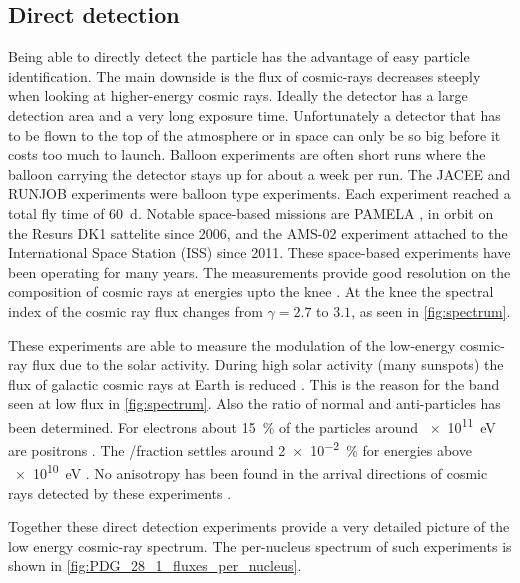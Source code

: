 \subsection{Direct detection}

Being able to directly detect the particle has the advantage of easy particle identification. The main downside is the flux of cosmic-rays decreases steeply when looking at higher-energy cosmic rays. Ideally the detector has a large detection area and a very long exposure time. Unfortunately a detector that has to be flown to the top of the atmosphere or in space can only be so big before it costs too much to launch. Balloon experiments are often short runs where the balloon carrying the detector stays up for about a week per run. The JACEE \cite{asakimori1998jacee} and RUNJOB \cite{hareyama2011runjob} experiments were balloon type experiments. Each experiment reached a total fly time of \SI{60}{\day}. Notable space-based missions are PAMELA \cite{adriani2014pamela}, in orbit on the Resurs DK1 sattelite since 2006, and the AMS-02 \cite{casaus2014ams} experiment attached to the International Space Station (ISS) since 2011. These space-based experiments have been operating for many years. The measurements provide good resolution on the composition of cosmic rays at energies upto the knee \cite{amenomori2008knee}. At the knee the spectral index of the cosmic ray flux changes from $\gamma = 2.7$ to $3.1$, as seen in \cref{fig:spectrum}.

These experiments are able to measure the modulation of the low-energy cosmic-ray flux due to the solar activity. During high solar activity (many sunspots) the flux of galactic cosmic rays at Earth is reduced \cite{adriani2013modulation}. This is the reason for the band seen at low flux in \cref{fig:spectrum}. Also the ratio of normal and anti-particles has been determined. For electrons about \SI{15}{\percent} of the particles around \SI{e11}{\eV} are positrons \cite{aguilar2013positrons}. The \APproton/\Pproton fraction settles around \SI{2e-2}{\percent} for energies above \SI{e10}{\eV} \cite{kappl2015antiproton}. No anisotropy has been found in the arrival directions of \APelectron\Pelectron cosmic rays detected by these experiments \cite{panico2015isotropy}.

Together these direct detection experiments provide a very detailed picture of the low energy cosmic-ray spectrum. The per-nucleus spectrum of such experiments is shown in \cref{fig:PDG_28_1_fluxes_per_nucleus}.

